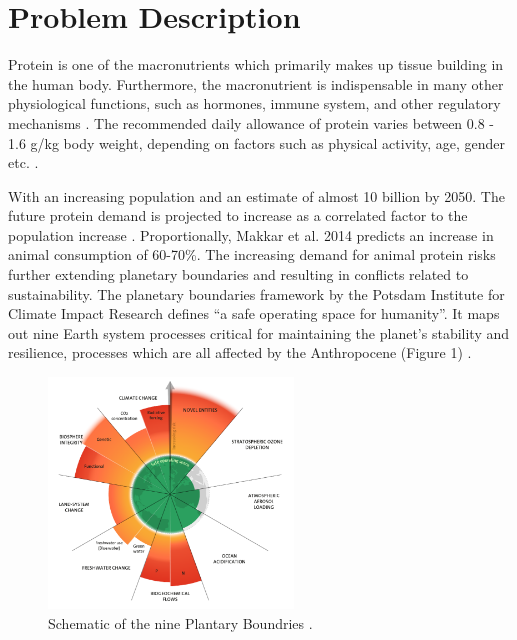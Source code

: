 \setcounter{chapter}{1}
\setcounter{section}{0}
\setlength{\headheight}{12.71342pt}
\addtolength{\topmargin}{-0.71342pt}

\section{Problem Description}
Protein is one of the macronutrients which primarily makes up tissue building in the human body. Furthermore, the macronutrient is indispensable in many other physiological functions, such as hormones, immune system, and other regulatory mechanisms \cite*{Ferrari2022AnimalPlantProtein}. The recommended daily allowance of protein varies between 0.8 - 1.6 g/kg body weight, depending on factors such as physical activity, age, gender etc. \cite*{Phillips2016ProteinBeyondRDA}.

\vspace{1em}
With an increasing population and an estimate of almost 10 billion by 2050. The future protein demand is projected to increase as a correlated factor to the population increase \cite*{henchion2017futureprotein}. Proportionally, Makkar et al. 2014 predicts an increase in animal consumption of 60-70\%. The increasing demand for animal protein risks further extending planetary boundaries and resulting in conflicts related to sustainability. The planetary boundaries framework by the Potsdam Institute for Climate Impact Research defines “a safe operating space for humanity”. It maps out nine Earth system processes critical for maintaining the planet's stability and resilience, processes which are all affected by the Anthropocene (Figure 1) \cite*{Richardson2023EarthBeyondBoundaries}.

\begin{figure}[H]
    \centering
    \includegraphics[width=0.58\textwidth]{Figures/fig_01.png}
    \caption{Schematic of the nine Plantary Boundries \cite*{Richardson2023EarthBeyondBoundaries}.}
    \label{fig:introduction_01}
\end{figure}

